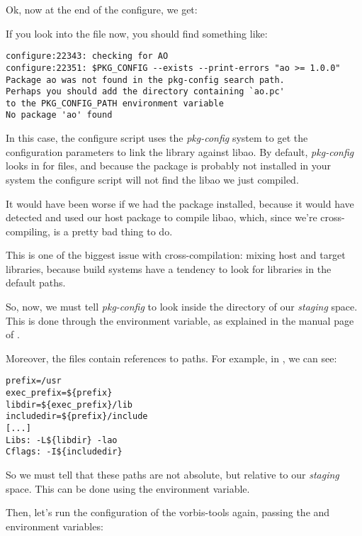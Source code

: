 Ok, now at the end of the configure, we get:

If you look into the  file now, you should find
something like:

\begin{verbatim}
configure:22343: checking for AO
configure:22351: $PKG_CONFIG --exists --print-errors "ao >= 1.0.0"
Package ao was not found in the pkg-config search path.
Perhaps you should add the directory containing `ao.pc'
to the PKG_CONFIG_PATH environment variable
No package 'ao' found
\end{verbatim}

In this case, the configure script uses the {\em pkg-config} system to
get the configuration parameters to link the library against libao. By
default, {\em pkg-config} looks in  for
 files, and because the  package is probably
not installed in your system the configure script will not find the
libao we just compiled.

It would have been worse if we had the package installed, because it
would have detected and used our host package to compile libao, which,
since we're cross-compiling, is a pretty bad thing to do.

This is one of the biggest issue with cross-compilation: mixing host
and target libraries, because build systems have a tendency to look
for libraries in the default paths.

So, now, we must tell {\em pkg-config} to look inside the
 directory of our {\em staging} space. This
is done through the  environment variable, as
explained in the manual page of .

Moreover, the  files contain references to paths. For
example, in
,
we can see:

\begin{verbatim}
prefix=/usr
exec_prefix=${prefix}
libdir=${exec_prefix}/lib
includedir=${prefix}/include
[...]
Libs: -L${libdir} -lao
Cflags: -I${includedir}
\end{verbatim}

So we must tell  that these paths are not absolute,
but relative to our {\em staging} space. This can be done using the
 environment variable.

Then, let's run the configuration of the vorbis-tools again, passing
the  and 
environment variables:

